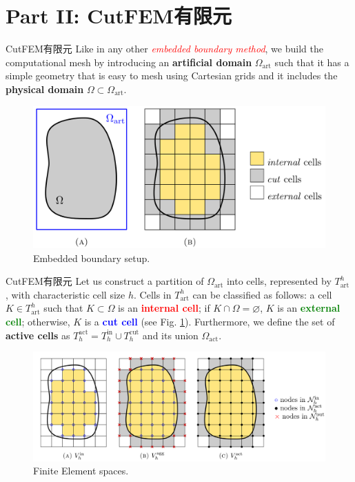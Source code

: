\documentclass[lang=en,aspectratio=43,theme=default,logo=on]{simplebeamer}
\begin{document}
\section{Part II: CutFEM有限元}

\begin{frame}{CutFEM有限元}
    Like in any other \textcolor{red}{\emph{embedded boundary method}}, we build the computational mesh by introducing an \textbf{artificial
        domain} $\Omega_{\mathrm{art}}$ such that it has a simple geometry that is easy to mesh using Cartesian grids and it includes the \textbf{physical domain} $\Omega \subset \Omega_{\mathrm{art}}$.
    \begin{figure}
        \centering
        \includegraphics[height=0.5\textheight]{./img/004.png}
        \caption{Embedded boundary setup.}
        \label{f004}
    \end{figure}
\end{frame}

\begin{frame}{CutFEM有限元}
    Let us construct a partition of $\Omega_{\mathrm{art}}$ into cells, represented by $T^h_{\mathrm{art}}$ , with characteristic cell size $h$. Cells in $T^h_{\mathrm{art}}$ can be classified as
    follows: a cell $K \in T^h_{\mathrm{art}}$ such that $K \subset \Omega$ is an \textcolor{red}{\textbf{internal cell}}; if $K\cap \Omega =\varnothing$, $K$ is an \textcolor{green}{\textbf{external cell}}; otherwise,
    $K$ is a \textcolor{blue}{\textbf{cut cell}} (see Fig. \ref{f004}). Furthermore, we define the set of \textbf{active cells} as $T^\mathrm{act}_h = T^\mathrm{in}_h  \cup T^\mathrm{cut}_h $ and its union $\Omega_{\mathrm{act}}$.
    \begin{figure}
        \centering
        \includegraphics[height=0.4\textheight]{./img/005.png}
        \caption{Finite Element spaces.}
        \label{f005}
    \end{figure}
\end{frame}
\end{document}
